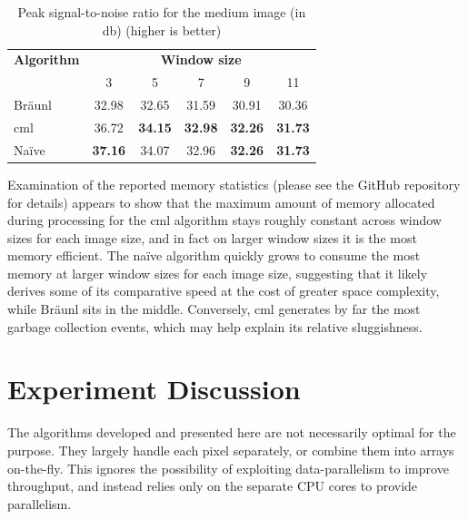 \begin{table}
\centering
\caption[Peak signal-to-noise for the medium image]{Peak signal-to-noise ratio for the medium image (in \unit{\decibel}) (higher is better)}
\begin{tabular}{@{}lccccc@{}}
\toprule
\multicolumn{1}{c}{\textbf{Algorithm}} & \multicolumn{5}{c}{\textbf{Window size}}                                           \\
                                       & 3              & 5              & 7              & 9              & 11             \\ \midrule
Bräunl                                 & 32.98          & 32.65          & 31.59          & 30.91          & 30.36          \\
\gls{cml}                                    & 36.72          & \textbf{34.15} & \textbf{32.98} & \textbf{32.26} & \textbf{31.73} \\
Naïve                                  & \textbf{37.16} & 34.07          & 32.96          & \textbf{32.26} & \textbf{31.73} \\ \bottomrule
\end{tabular}
\label{tab:median:psnrmedium}
\end{table}

Examination of the reported memory statistics (please see the GitHub repository for details) appears to show that the maximum amount of memory allocated during processing for the \gls{cml} algorithm stays roughly constant across window sizes for each image size, and in fact on larger window sizes it is the most memory efficient.  The naïve algorithm quickly grows to consume the most memory at larger window sizes for each image size, suggesting that it likely derives some of its comparative speed at the cost of greater space complexity, while Bräunl sits in the middle.  Conversely, \gls{cml} generates by far the most garbage collection events, which may help explain its relative sluggishness.

\section{Experiment Discussion}

The algorithms developed and presented here are not necessarily optimal for the purpose.  They largely handle each pixel separately, or combine them into arrays on-the-fly.  This ignores the possibility of exploiting data-parallelism to improve throughput, and instead relies only on the separate CPU cores to provide parallelism.

